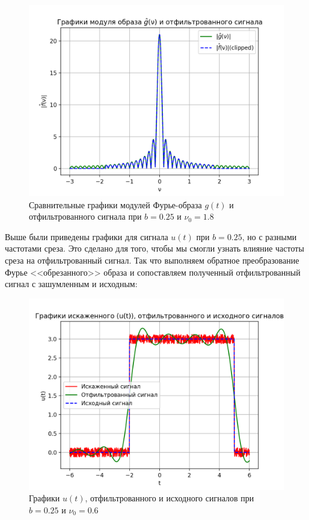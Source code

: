 \begin{figure}[ht!]
    \centering
    \includegraphics[scale=0.55]{media/1 task/high_freq/Fourier_Image_Comparison_0,25_-1,7987987987987988.png}
    \caption{Сравнительные графики модулей Фурье-образа $g(t)$ и отфильтрованного сигнала при $b=0.25$ и $\nu_0=1.8$}
    \label{fig:fourc_025_18}
\end{figure}

Выше были приведены графики для сигнала $u(t)$ при $b=0.25$, но с разными частотами среза. Это сделано для того, чтобы мы смогли узнать влияние частоты среза на отфильтрованный сигнал. Так что выполняем обратное преобразование Фурье <<обрезанного>> образа и сопоставляем полученный отфильтрованный сигнал с зашумленным и исходным:

\clearpage

\begin{figure}[ht!]
    \centering
    \includegraphics[scale=0.85]{media/1 task/high_freq/Cleaned_0,25_-0,5975975975975976.png}
    \caption{Графики  $u(t)$, отфильтрованного и исходного сигналов при $b=0.25$ и $\nu_0=0.6$}
    \label{fig:cleaned_025_06}
\end{figure}


